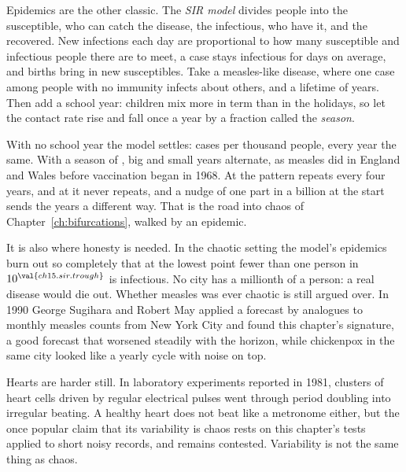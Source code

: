 Epidemics are the other classic. The \emph{SIR model} divides people into
the susceptible, who can catch the disease, the infectious, who have it, and
the recovered. New infections each day are proportional to how many
susceptible and infectious people there are to meet, a case stays infectious
for  days on average, and births bring in new
susceptibles. Take a measles-like disease, where one case among people with
no immunity infects about  others, and a lifetime of
 years. Then add a school year: children mix more in term
than in the holidays, so let the contact rate rise and fall once a year by a
fraction called the \emph{season}.



\noindent
With no school year the model settles:  cases per
thousand people, every year the same. With a season of ,
big and small years alternate, as measles did in England and Wales before
vaccination began in 1968. At  the pattern repeats every
four years, and at  it never repeats, and a nudge of one
part in a billion at the start sends the years a different way. That is the
road into chaos of Chapter~\ref{ch:bifurcations}, walked by an epidemic.

It is also where honesty is needed. In the chaotic setting the model's
epidemics burn out so completely that at the lowest point fewer than one
person in $10^{\val{ch15.sir.trough}}$ is infectious. No city has a
millionth of a person: a real disease would die out. Whether measles was ever
chaotic is still argued over. In 1990 George Sugihara and Robert May applied a forecast by analogues to
monthly measles counts from New York City and found this chapter's
signature, a good forecast that worsened steadily with the horizon, while
chickenpox in the same city looked like a yearly cycle with noise on top.

Hearts are harder still. In laboratory experiments reported in 1981, clusters
of heart cells driven by regular electrical pulses went through period
doubling into irregular beating. A healthy heart does not beat like a
metronome either, but the once popular claim that its variability is chaos
rests on this chapter's tests applied to short noisy records, and remains
contested. Variability is not the same thing as chaos.

